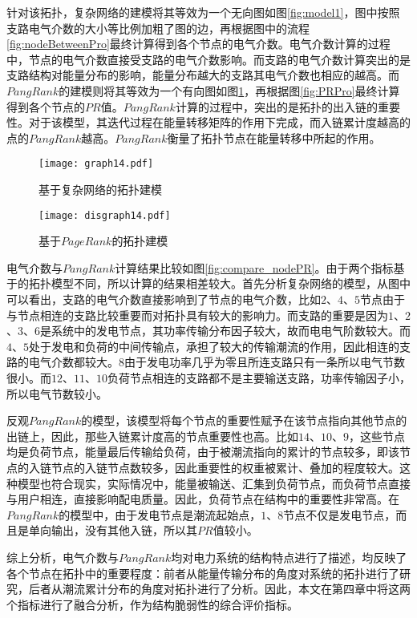 针对该拓扑，复杂网络的建模将其等效为一个无向图如图\ref{fig:model1}，图中按照支路电气介数的大小等比例加粗了图的边，再根据图中的流程\ref{fig:nodeBetweenPro}最终计算得到各个节点的电气介数。电气介数计算的过程中，节点的电气介数直接受支路的电气介数影响。而支路的电气介数计算突出的是支路结构对能量分布的影响，能量分布越大的支路其电气介数也相应的越高。而$PangRank$的建模则将其等效为一个有向图如图\ref{fig:model2}，再根据图\ref{fig:PRPro}最终计算得到各个节点的$PR$值。$PangRank$计算的过程中，突出的是拓扑的出入链的重要性。对于该模型，其迭代过程在能量转移矩阵的作用下完成，而入链累计度越高的点的$PangRank$越高。$PangRank$衡量了拓扑节点在能量转移中所起的作用。
\begin{figure}[H]
\begin{minipage}{0.48\textwidth}
  \centering
  \texttt{[image: graph14.pdf]}
  \caption{基于复杂网络的拓扑建模}
  \label{fig:model1}
\end{minipage}\hfill
\begin{minipage}{0.48\textwidth}
  \centering
  \texttt{[image: disgraph14.pdf]}
  \caption{基于$PageRank$的拓扑建模}
  \label{fig:model2}
\end{minipage}
\end{figure}
电气介数与$PangRank$计算结果比较如图\ref{fig:compare_nodePR}。由于两个指标基于的拓扑模型不同，所以计算的结果相差较大。首先分析复杂网络的模型，从图中可以看出，支路的电气介数直接影响到了节点的电气介数，比如$2$、$4$、$5$节点由于与节点相连的支路比较重要而对拓扑具有较大的影响力。而支路的重要是因为$1$、$2$、$3$、$6$是系统中的发电节点，其功率传输分布因子较大，故而电电气阶数较大。而$4$、$5$处于发电和负荷的中间传输点，承担了较大的传输潮流的作用，因此相连的支路的电气介数都较大。$8$由于发电功率几乎为零且所连支路只有一条所以电气节数很小。而$12$、$11$、$10$负荷节点相连的支路都不是主要输送支路，功率传输因子小，所以电气节数较小。

反观$PangRank$的模型，该模型将每个节点的重要性赋予在该节点指向其他节点的出链上，因此，那些入链累计度高的节点重要性也高。比如$14$、$10$、$9$，这些节点均是负荷节点，能量最后传输给负荷，由于被潮流指向的累计的节点较多，即该节点的入链节点的入链节点数较多，因此重要性的权重被累计、叠加的程度较大。这种模型也符合现实，实际情况中，能量被输送、汇集到负荷节点，而负荷节点直接与用户相连，直接影响配电质量。因此，负荷节点在结构中的重要性非常高。在$PangRank$的模型中，由于发电节点是潮流起始点，$1$、$8$节点不仅是发电节点，而且是单向输出，没有其他入链，所以其$PR$值较小。

综上分析，电气介数与$PangRank$均对电力系统的结构特点进行了描述，均反映了各个节点在拓扑中的重要程度：前者从能量传输分布的角度对系统的拓扑进行了研究，后者从潮流累计分布的角度对拓扑进行了分析。因此，本文在第四章中将这两个指标进行了融合分析，作为结构脆弱性的综合评价指标。

